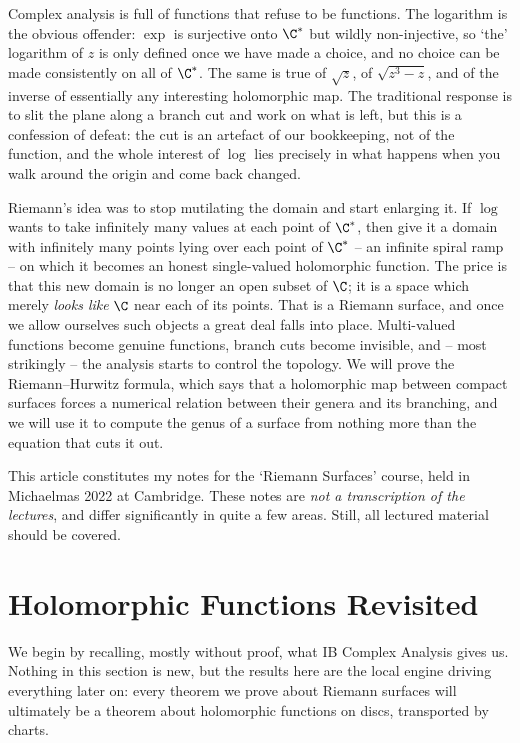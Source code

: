 



Complex analysis is full of functions that refuse to be functions. The logarithm is the
obvious offender: $\exp$ is surjective onto $\C^*$ but wildly non-injective, so `the'
logarithm of $z$ is only defined once we have made a choice, and no choice can be made
consistently on all of $\C^*$. The same is true of $\sqrt{z}$, of $\sqrt{z^3 - z}$, and
of the inverse of essentially any interesting holomorphic map. The traditional response
is to slit the plane along a branch cut and work on what is left, but this is a
confession of defeat: the cut is an artefact of our bookkeeping, not of the function,
and the whole interest of $\log$ lies precisely in what happens when you walk around the
origin and come back changed.

Riemann's idea was to stop mutilating the domain and start enlarging it. If $\log$ wants
to take infinitely many values at each point of $\C^*$, then give it a domain with
infinitely many points lying over each point of $\C^*$ -- an infinite spiral ramp -- on
which it becomes an honest single-valued holomorphic function. The price is that this new
domain is no longer an open subset of $\C$; it is a space which merely \emph{looks like}
$\C$ near each of its points. That is a Riemann surface, and once we allow ourselves such
objects a great deal falls into place. Multi-valued functions become genuine functions,
branch cuts become invisible, and -- most strikingly -- the analysis starts to control the
topology. We will prove the Riemann--Hurwitz formula, which says that a holomorphic map
between compact surfaces forces a numerical relation between their genera and its
branching, and we will use it to compute the genus of a surface from nothing more than
the equation that cuts it out.

This article constitutes my notes for the `Riemann Surfaces' course, held in Michaelmas
2022 at Cambridge. These notes are \emph{not a transcription of the lectures}, and differ
significantly in quite a few areas. Still, all lectured material should be covered.



\section{Holomorphic Functions Revisited}

We begin by recalling, mostly without proof, what IB Complex Analysis gives us. Nothing
in this section is new, but the results here are the local engine driving everything
later on: every theorem we prove about Riemann surfaces will ultimately be a theorem
about holomorphic functions on discs, transported by charts.

